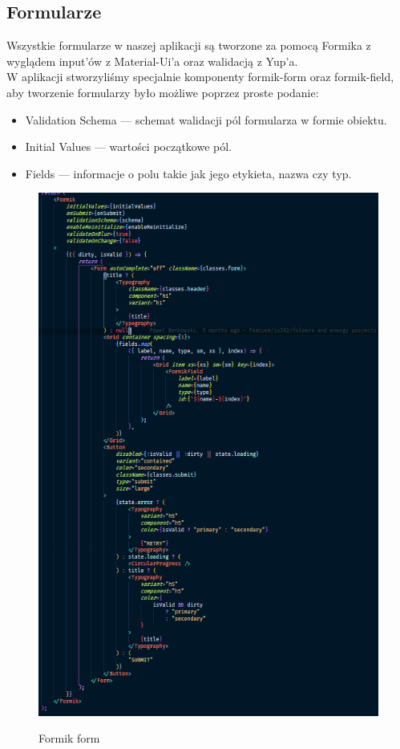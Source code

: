 \documentclass[a4paper,11pt]{report}
\begin{document}
\subsection{Formularze}
\label{subsec:forms}
Wszystkie formularze w naszej aplikacji są tworzone za pomocą Formika z wyglądem input'ów z Material-Ui'a oraz walidacją z Yup'a.\\
W aplikacji stworzyliśmy specjalnie komponenty formik-form oraz formik-field, aby tworzenie formularzy było możliwe poprzez proste podanie:
\begin{itemize}
	\item Validation Schema — schemat walidacji pól formularza w formie obiektu.
	\item Initial Values — wartości początkowe pól.
	\item Fields — informacje o polu takie jak jego etykieta, nazwa czy typ.
\end{itemize}
\begin{figure}[H]
	\centering
	\includegraphics[scale=0.5]{implementacja/frontend/formik_form}\\
	\caption{Formik form}
	\label{fig:formik_form}
\end{figure}
\end{document}

